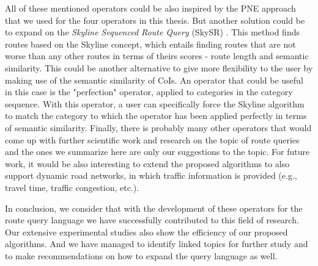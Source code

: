 All of these mentioned operators could be also inspired by the PNE approach that we used for the four operators in this thesis. But another solution could be to expand on the \textit{Skyline Sequenced Route Query} (SkySR) \cite{skyline}. This method finds routes based on the Skyline concept, which entails finding routes that are not worse than any other routes in terms of theirs scores - route length and semantic similarity. This could be another alternative to give more flexibility to the user by making use of the semantic similarity of CoIs. An operator that could be useful in this case is the "perfection" operator, applied to categories in the category sequence. With this operator, a user can specifically force the Skyline algorithm to match the category to which the operator has been applied perfectly in terms of semantic similarity. Finally, there is probably many other operators that would come up with further scientific work and research on the topic of route queries and the ones we summarize here are only our suggestions to the topic. For future work, it would be also interesting to extend the proposed algorithms to also support dynamic road networks, in which traffic information is provided (e.g., travel time, traffic congestion, etc.).
\enlargethispage{60pt}

In conclusion, we consider that with the development of these operators for the route query language we have successfully contributed to this field of research. Our extensive experimental studies also show the efficiency of our proposed algorithms. And we have managed to identify linked topics for further study and to make recommendations on how to expand the query language as well. 

\pagebreak
